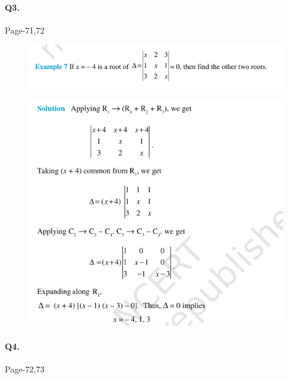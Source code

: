 \documentclass{article}
\begin{document}
\paragraph{Q3.}
\begin{flushright}
Page-71,72
\end{flushright}

\begin{figure}[H]
    \includegraphics[scale=0.5]{determinants_l2_ps_31.png}
\end{figure}
\begin{figure}[H]
    \includegraphics[scale=0.5]{determinants_l2_ps_32.png}
\clearpage\end{figure}
\paragraph{Q4.}
\begin{flushright}
Page-72,73
\end{flushright}
\end{document}
